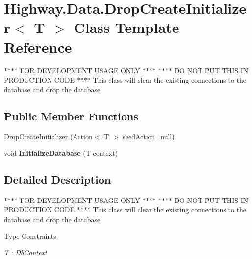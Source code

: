 \hypertarget{class_highway_1_1_data_1_1_drop_create_initializer-g}{\section{Highway.\-Data.\-Drop\-Create\-Initializer$<$ T $>$ Class Template Reference}
\label{class_highway_1_1_data_1_1_drop_create_initializer-g}
}


$\ast$$\ast$$\ast$$\ast$ F\-O\-R D\-E\-V\-E\-L\-O\-P\-M\-E\-N\-T U\-S\-A\-G\-E O\-N\-L\-Y $\ast$$\ast$$\ast$$\ast$ $\ast$$\ast$$\ast$$\ast$ D\-O N\-O\-T P\-U\-T T\-H\-I\-S I\-N P\-R\-O\-D\-U\-C\-T\-I\-O\-N C\-O\-D\-E $\ast$$\ast$$\ast$$\ast$ This class will clear the existing connections to the database and drop the database  


\subsection*{Public Member Functions}
\begin{DoxyCompactItemize}
\item 
\hyperlink{class_highway_1_1_data_1_1_drop_create_initializer-g_a9782d33ac411f497fb0813e7d7bc2f77}{Drop\-Create\-Initializer} (Action$<$ T $>$ seed\-Action=null)
\begin{DoxyCompactList}\small\item\em \end{DoxyCompactList}\item 
\hypertarget{class_highway_1_1_data_1_1_drop_create_initializer-g_a768696b7edb69dc514816f5f30cbd13e}{void {\bfseries Initialize\-Database} (T context)}\label{class_highway_1_1_data_1_1_drop_create_initializer-g_a768696b7edb69dc514816f5f30cbd13e}

\end{DoxyCompactItemize}


\subsection{Detailed Description}
$\ast$$\ast$$\ast$$\ast$ F\-O\-R D\-E\-V\-E\-L\-O\-P\-M\-E\-N\-T U\-S\-A\-G\-E O\-N\-L\-Y $\ast$$\ast$$\ast$$\ast$ $\ast$$\ast$$\ast$$\ast$ D\-O N\-O\-T P\-U\-T T\-H\-I\-S I\-N P\-R\-O\-D\-U\-C\-T\-I\-O\-N C\-O\-D\-E $\ast$$\ast$$\ast$$\ast$ This class will clear the existing connections to the database and drop the database 

\begin{Desc}
\item[Type Constraints]\begin{description}
\item[{\em T} : {\em Db\-Context}]\end{description}
\end{Desc}


